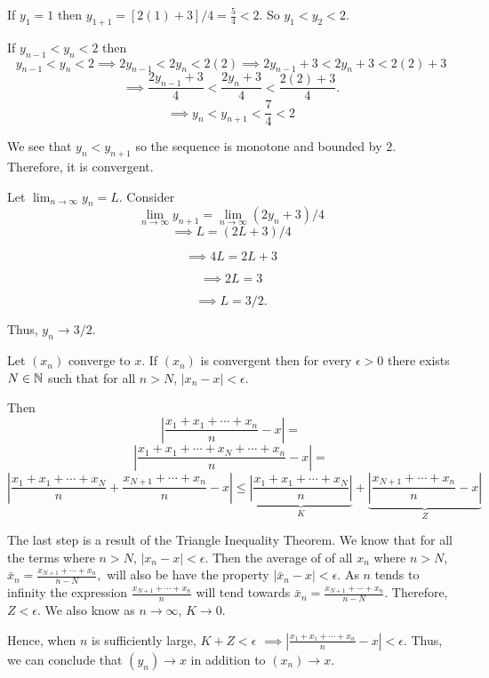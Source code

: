 \documentclass{report}
\begin{document}
\begin{myproof}

  If $y_1 = 1$ then $y_{1+1} =  [2(1) +3]/4 = \frac{5}{4} < 2.$ So $y_1 < y_2 < 2.$
    
  If $y_{n-1}<y_n<2$ then $$y_{n-1}<y_{n}<2 \implies 2y_{n-1}<2y_{n}<2(2)\implies 2y_{n-1} + 3<2y_{n} +3 <2(2) +3  $$
 $$ \implies \frac{2y_{n-1} + 3}{4}<\frac{2y_{n} +3}{4} <\frac{2(2) +3}{4}. $$
 $$ \implies y_{n} <y_{n+1} <\frac{7}{4} < 2$$

We see that $y_n < y_{n+1}$ so the sequence is monotone and bounded by $2.$  Therefore, it is convergent.
\par
Let $\lim_{n \rightarrow \infty} y_{n} = L$. Consider $$\lim_{n \rightarrow \infty} y_{n+1} = \lim_{n \rightarrow \infty}\left(2 y_n+3\right) / 4$$ 
$$\implies L = \left(2 L+3\right) / 4$$ 

$$\implies 4L = 2 L+3$$ 

$$\implies 2L = 3$$ 

$$\implies L = 3/2.$$ 

Thus, ${y_n} \rightarrow 3/2.$
\end{myproof}
\pagebreak

\bigskip
\begin{myproof}
    
  Let $(x_n)$ converge to $x$. If $(x_n)$ is convergent then for every $\epsilon >0$ there exists $N \in \NN$ such that for all $n > N$, $| x_{n} - x| < \epsilon.$

  Then $$ \left| \frac{x_1 + x_1 +\cdots + x_{n} }{n}  - x\right|= $$$$ \left| \frac{x_1 + x_1 + \cdots + x_{N}+ \cdots + x_{n} }{n}  - x\right|= $$
$$ \left| \frac{x_1 + x_1 + \cdots + x_{N}}{n} + \frac{ x_{N+1}+ \cdots + x_{n} }{n} - x\right| \leq \underbrace{\left| \frac{x_1 + x_1 + \cdots + x_{N}}{n} \right|}_{K}+ \underbrace{ \left|\frac{ x_{N + 1}+ \cdots + x_{n} }{n} - x\right|}_{Z}$$

The last step is a result of the Triangle Inequality Theorem. We know that for all the terms where $n>N$, $| x_{n} - x| < \epsilon.$ Then the average of of all $x_n$ where $n>N$, $ \bar{x}_n =\frac{ x_{N + 1}+ \cdots + x_{n} }{n-N},$ will also be have the property $|\bar{x}_n - x| < \epsilon$.  As $n$ tends to infinity the expression $\frac{ x_{N + 1} + \cdots + x_{n} }{n}$  will tend towards $ \bar{x}_n =\frac{ x_{N + 1}+ \cdots + x_{n} }{n-N}.$ Therefore, $Z < \epsilon.$ We also know as $n \rightarrow \infty $, $K \rightarrow 0.$

Hence, when $n$ is sufficiently large, $K + Z <\epsilon$
$  \implies\left| \frac{x_1 + x_1 +\cdots + x_{n} }{n}  - x\right|< \epsilon.$
Thus, we can conclude that $(y_n) \rightarrow x$ in addition to $(x_n) \rightarrow x.$
\bigskip
\end{myproof}
\end{document}
